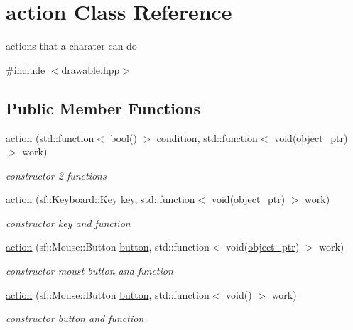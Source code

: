 \hypertarget{classaction}{}\section{action Class Reference}
\label{classaction}


actions that a charater can do  




{\ttfamily \#include $<$drawable.\+hpp$>$}

\subsection*{Public Member Functions}
\begin{DoxyCompactItemize}
\item 
\hyperlink{classaction_a481b1b2e3892600143fd7b2db4ac5729}{action} (std\+::function$<$ bool() $>$ condition, std\+::function$<$ void(\hyperlink{typedefs_8hpp_aab5add95f06d2ba25dbfed8eb07274fa}{object\+\_\+ptr}) $>$ work)
\begin{DoxyCompactList}\small\item\em constructor 2 functions \end{DoxyCompactList}\item 
\hyperlink{classaction_a504531cbc56e9c4a60b4e5d40bc018a6}{action} (sf\+::\+Keyboard\+::\+Key key, std\+::function$<$ void(\hyperlink{typedefs_8hpp_aab5add95f06d2ba25dbfed8eb07274fa}{object\+\_\+ptr}) $>$ work)
\begin{DoxyCompactList}\small\item\em constructor key and function \end{DoxyCompactList}\item 
\hyperlink{classaction_abf43e8dfaeca2df9d356fbfd4d1790ba}{action} (sf\+::\+Mouse\+::\+Button \hyperlink{classbutton}{button}, std\+::function$<$ void(\hyperlink{typedefs_8hpp_aab5add95f06d2ba25dbfed8eb07274fa}{object\+\_\+ptr}) $>$ work)
\begin{DoxyCompactList}\small\item\em constructor moust button and function \end{DoxyCompactList}\item 
\hyperlink{classaction_a55a91caa9803002fa7ddd6e9e9e46dc6}{action} (sf\+::\+Mouse\+::\+Button \hyperlink{classbutton}{button}, std\+::function$<$ void() $>$ work)
\begin{DoxyCompactList}\small\item\em constructor button and function \end{DoxyCompactList}\item 

\end{DoxyCompactItemize}
